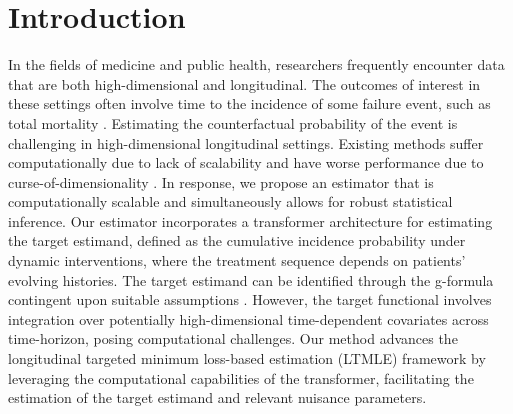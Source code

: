 \documentclass{article}
\theoremstyle{plain}
\theoremstyle{definition}
\theoremstyle{remark}
\begin{document}
\section{Introduction}
In the fields of medicine and public health, researchers frequently encounter data that are both high-dimensional and longitudinal. The outcomes of interest in these settings often involve time to the incidence of some failure event, such as total mortality \cite{van2012unified, salerno2023high}. Estimating the counterfactual probability of the event is challenging in high-dimensional longitudinal settings. Existing methods suffer computationally due to lack of scalability and have worse performance due to curse-of-dimensionality \cite{wyss_machine_learning_2022}. In response, we propose an estimator that is computationally scalable and simultaneously allows for robust statistical inference. Our estimator incorporates a transformer architecture for estimating the target estimand, defined as the cumulative incidence probability under dynamic interventions, where the treatment sequence depends on patients' evolving histories. The target estimand can be identified through the g-formula contingent upon suitable assumptions \cite{robins1986new}. However, the target functional involves integration over potentially high-dimensional time-dependent covariates across time-horizon, posing computational challenges. Our method advances the longitudinal targeted minimum loss-based estimation (LTMLE) framework \cite{laanTargetedMinimumLoss2012, ltmle_rpackage} by leveraging the computational capabilities of the transformer, facilitating the estimation of the target estimand and relevant nuisance parameters.

\end{document}
